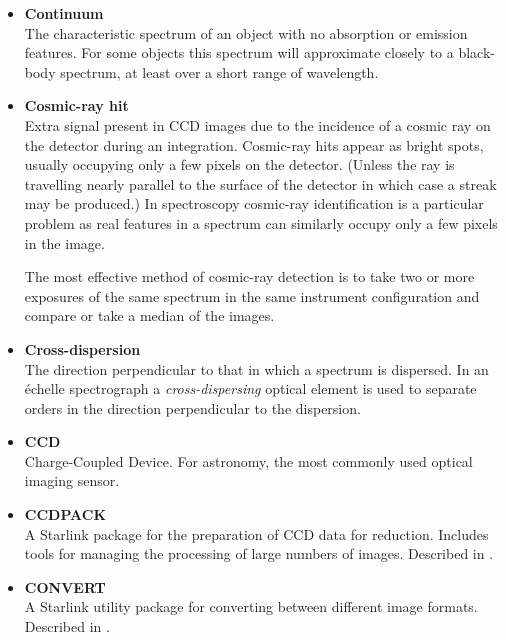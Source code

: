 {{\begin{itemize}
\item {\bf\label{gl_continuum}Continuum}\\
      The characteristic spectrum of an object with no absorption or
      emission features.  For some objects this spectrum will approximate
      closely to a black-body spectrum, at least over a short range of
      wavelength.

\item {\bf\label{gl_cosmic_ray}Cosmic-ray hit}\\
      Extra signal present in CCD images due to the incidence of a cosmic
      ray on the detector during an integration.  Cosmic-ray hits appear
      as bright spots, usually occupying only a few pixels on the detector.
      (Unless the ray is travelling nearly parallel to the surface of the
      detector in which case a streak may be produced.)
      In spectroscopy cosmic-ray identification is a particular problem
      as real features in a spectrum can similarly occupy only a few pixels
      in the image.

      The most effective method of cosmic-ray detection is to take
      two or more exposures of the same spectrum in the same instrument
      configuration and compare or take a median of the images.

\item {\bf\label{gl_cross_dispersion}Cross-dispersion}\\
      The direction perpendicular to that in which a spectrum is
      dispersed.  In an \'{e}chelle spectrograph a {\sl cross-dispersing}
      optical element is used to separate orders in the
      direction perpendicular to the dispersion.

\item {\bf\label{gl_ccd}CCD}\\
      Charge-Coupled Device.   For astronomy, the most commonly used
      optical imaging sensor.

\item {\bf\label{gl_ccdpack}CCDPACK}\\
      A Starlink package for the preparation of CCD data for reduction.
      Includes tools for managing the processing of large numbers of
      images.  Described in .

\item {\bf\label{gl_convert}CONVERT}\\
      A Starlink utility package for converting between different image
      formats.  Described in \cite{convert}.


\end{itemize}}}
